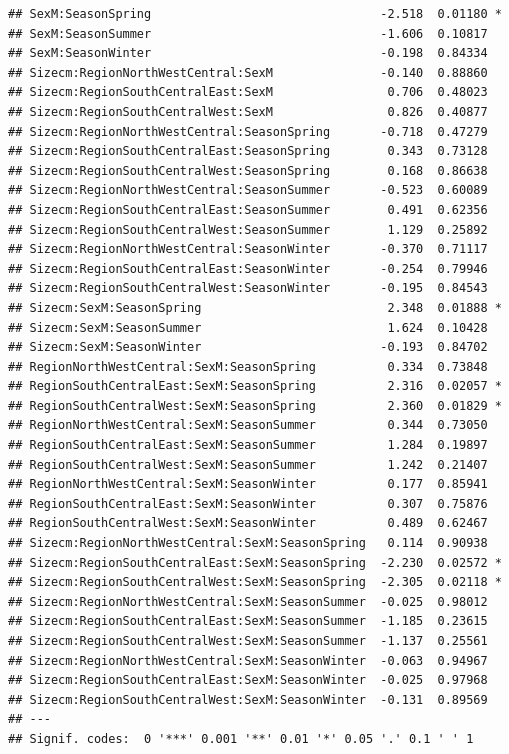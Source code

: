 \documentclass{article}\usepackage[]{graphicx}\usepackage[]{color}
\makeatletter
\newenvironment{kframe}{%
 \def\at@end@of@kframe{}%
 \ifinner\ifhmode%
  \def\at@end@of@kframe{\end{minipage}}%
  \begin{minipage}{\columnwidth}%
 \fi\fi%
 \def\FrameCommand##1{\hskip\@totalleftmargin \hskip-\fboxsep
 \colorbox{shadecolor}{##1}\hskip-\fboxsep
     \hskip-\linewidth \hskip-\@totalleftmargin \hskip\columnwidth}%
 \MakeFramed {\advance\hsize-\width
   \@totalleftmargin\z@ \linewidth\hsize
   \@setminipage}}%
 {\par\unskip\endMakeFramed%
 \at@end@of@kframe}
\newenvironment{knitrout}{}{} %
\makeatother
\begin{document}
\begin{knitrout}
\begin{kframe}
\begin{verbatim}
## SexM:SeasonSpring                                -2.518  0.01180 * 
## SexM:SeasonSummer                                -1.606  0.10817   
## SexM:SeasonWinter                                -0.198  0.84334   
## Sizecm:RegionNorthWestCentral:SexM               -0.140  0.88860   
## Sizecm:RegionSouthCentralEast:SexM                0.706  0.48023   
## Sizecm:RegionSouthCentralWest:SexM                0.826  0.40877   
## Sizecm:RegionNorthWestCentral:SeasonSpring       -0.718  0.47279   
## Sizecm:RegionSouthCentralEast:SeasonSpring        0.343  0.73128   
## Sizecm:RegionSouthCentralWest:SeasonSpring        0.168  0.86638   
## Sizecm:RegionNorthWestCentral:SeasonSummer       -0.523  0.60089   
## Sizecm:RegionSouthCentralEast:SeasonSummer        0.491  0.62356   
## Sizecm:RegionSouthCentralWest:SeasonSummer        1.129  0.25892   
## Sizecm:RegionNorthWestCentral:SeasonWinter       -0.370  0.71117   
## Sizecm:RegionSouthCentralEast:SeasonWinter       -0.254  0.79946   
## Sizecm:RegionSouthCentralWest:SeasonWinter       -0.195  0.84543   
## Sizecm:SexM:SeasonSpring                          2.348  0.01888 * 
## Sizecm:SexM:SeasonSummer                          1.624  0.10428   
## Sizecm:SexM:SeasonWinter                         -0.193  0.84702   
## RegionNorthWestCentral:SexM:SeasonSpring          0.334  0.73848   
## RegionSouthCentralEast:SexM:SeasonSpring          2.316  0.02057 * 
## RegionSouthCentralWest:SexM:SeasonSpring          2.360  0.01829 * 
## RegionNorthWestCentral:SexM:SeasonSummer          0.344  0.73050   
## RegionSouthCentralEast:SexM:SeasonSummer          1.284  0.19897   
## RegionSouthCentralWest:SexM:SeasonSummer          1.242  0.21407   
## RegionNorthWestCentral:SexM:SeasonWinter          0.177  0.85941   
## RegionSouthCentralEast:SexM:SeasonWinter          0.307  0.75876   
## RegionSouthCentralWest:SexM:SeasonWinter          0.489  0.62467   
## Sizecm:RegionNorthWestCentral:SexM:SeasonSpring   0.114  0.90938   
## Sizecm:RegionSouthCentralEast:SexM:SeasonSpring  -2.230  0.02572 * 
## Sizecm:RegionSouthCentralWest:SexM:SeasonSpring  -2.305  0.02118 * 
## Sizecm:RegionNorthWestCentral:SexM:SeasonSummer  -0.025  0.98012   
## Sizecm:RegionSouthCentralEast:SexM:SeasonSummer  -1.185  0.23615   
## Sizecm:RegionSouthCentralWest:SexM:SeasonSummer  -1.137  0.25561   
## Sizecm:RegionNorthWestCentral:SexM:SeasonWinter  -0.063  0.94967   
## Sizecm:RegionSouthCentralEast:SexM:SeasonWinter  -0.025  0.97968   
## Sizecm:RegionSouthCentralWest:SexM:SeasonWinter  -0.131  0.89569   
## ---
## Signif. codes:  0 '***' 0.001 '**' 0.01 '*' 0.05 '.' 0.1 ' ' 1

\end{verbatim}
\end{kframe}
\end{knitrout}
\end{document}
